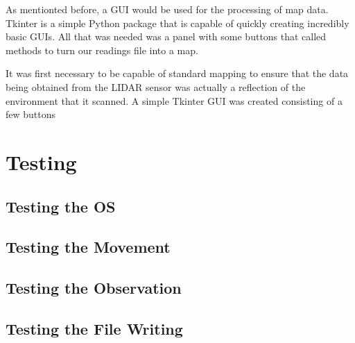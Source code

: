 				As mentionted before, a GUI would be used for the processing of map data. Tkinter is a simple Python package that is capable of quickly creating incredibly basic GUIs. All that was needed was a panel with some buttons that called methods to turn our readings file into a map.
				
				It was first necessary to be capable of standard mapping to ensure that the data being obtained from the LIDAR sensor was actually a reflection of the environment that it scanned. A simple Tkinter GUI was created consisting of a few buttons
	
	\chapter{Testing}
	
		\section{Testing the OS}
		
		\section{Testing the Movement}
			
		\section{Testing the Observation}
			
		\section{Testing the File Writing}
			
